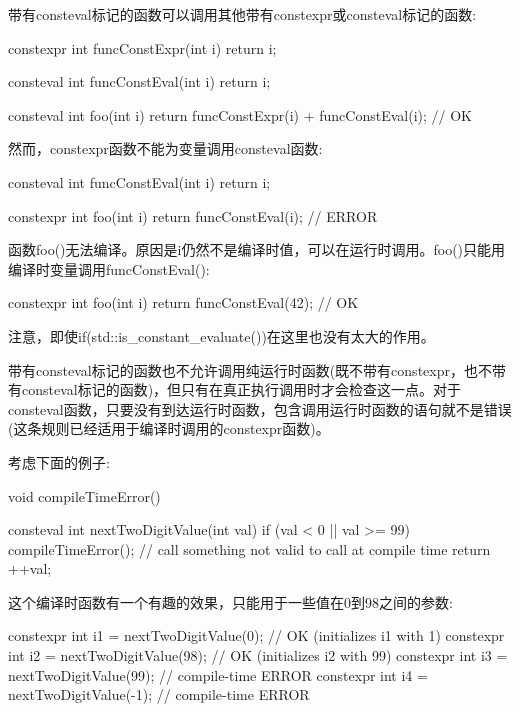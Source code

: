 
带有consteval标记的函数可以调用其他带有constexpr或consteval标记的函数:

\begin{cpp}
constexpr int funcConstExpr(int i) {
	return i;
}

consteval int funcConstEval(int i) {
	return i;
}

consteval int foo(int i) {
	return funcConstExpr(i) + funcConstEval(i); // OK
}
\end{cpp}

然而，constexpr函数不能为变量调用consteval函数:

\begin{cpp}
consteval int funcConstEval(int i) {
	return i;
}

constexpr int foo(int i) {
	return funcConstEval(i); // ERROR
}
\end{cpp}

函数foo()无法编译。原因是i仍然不是编译时值，可以在运行时调用。foo()只能用编译时变量调用funcConstEval():

\begin{cpp}
constexpr int foo(int i) {
	return funcConstEval(42); // OK
}
\end{cpp}

注意，即使if(std::is\_constant\_evaluate())在这里也没有太大的作用。

带有consteval标记的函数也不允许调用纯运行时函数(既不带有constexpr，也不带有consteval标记的函数)，但只有在真正执行调用时才会检查这一点。对于consteval函数，只要没有到达运行时函数，包含调用运行时函数的语句就不是错误(这条规则已经适用于编译时调用的constexpr函数)。

考虑下面的例子:

\begin{cpp}
void compileTimeError()
{
}

consteval int nextTwoDigitValue(int val)
{
	if (val < 0 || val >= 99) {
		compileTimeError(); // call something not valid to call at compile time
	}
	return ++val;
}
\end{cpp}

这个编译时函数有一个有趣的效果，只能用于一些值在0到98之间的参数:

\begin{cpp}
constexpr int i1 = nextTwoDigitValue(0); // OK (initializes i1 with 1)
constexpr int i2 = nextTwoDigitValue(98); // OK (initializes i2 with 99)
constexpr int i3 = nextTwoDigitValue(99); // compile-time ERROR
constexpr int i4 = nextTwoDigitValue(-1); // compile-time ERROR
\end{cpp}

